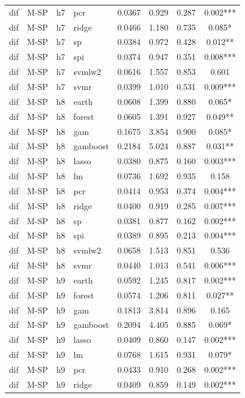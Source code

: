 \begin{ThreePartTable}
\begin{longtable}[t]{llclcccc}
dif & M-SP & h7 & pcr & 0.0367 & 0.929 & 0.287 & 0.002***\\
dif & M-SP & h7 & ridge & 0.0466 & 1.180 & 0.735 & 0.085*\\
dif & M-SP & h7 & sp & 0.0384 & 0.972 & 0.428 & 0.012**\\
dif & M-SP & h7 & spi & 0.0374 & 0.947 & 0.351 & 0.008***\\
dif & M-SP & h7 & svmlw2 & 0.0616 & 1.557 & 0.853 & 0.601\\
dif & M-SP & h7 & svmr & 0.0399 & 1.010 & 0.531 & 0.009***\\
\addlinespace
dif & M-SP & h8 & earth & 0.0608 & 1.399 & 0.880 & 0.065*\\
dif & M-SP & h8 & forest & 0.0605 & 1.391 & 0.927 & 0.049**\\
dif & M-SP & h8 & gam & 0.1675 & 3.854 & 0.900 & 0.085*\\
dif & M-SP & h8 & gamboost & 0.2184 & 5.024 & 0.887 & 0.031**\\
dif & M-SP & h8 & lasso & 0.0380 & 0.875 & 0.160 & 0.003***\\
dif & M-SP & h8 & lm & 0.0736 & 1.692 & 0.935 & 0.158\\
dif & M-SP & h8 & pcr & 0.0414 & 0.953 & 0.374 & 0.004***\\
dif & M-SP & h8 & ridge & 0.0400 & 0.919 & 0.285 & 0.007***\\
dif & M-SP & h8 & sp & 0.0381 & 0.877 & 0.162 & 0.002***\\
dif & M-SP & h8 & spi & 0.0389 & 0.895 & 0.213 & 0.004***\\
dif & M-SP & h8 & svmlw2 & 0.0658 & 1.513 & 0.851 & 0.536\\
dif & M-SP & h8 & svmr & 0.0440 & 1.013 & 0.541 & 0.006***\\
\addlinespace
dif & M-SP & h9 & earth & 0.0592 & 1.245 & 0.817 & 0.002***\\
dif & M-SP & h9 & forest & 0.0574 & 1.206 & 0.811 & 0.027**\\
dif & M-SP & h9 & gam & 0.1813 & 3.814 & 0.896 & 0.165\\
dif & M-SP & h9 & gamboost & 0.2094 & 4.405 & 0.885 & 0.069*\\
dif & M-SP & h9 & lasso & 0.0409 & 0.860 & 0.147 & 0.002***\\
dif & M-SP & h9 & lm & 0.0768 & 1.615 & 0.931 & 0.079*\\
dif & M-SP & h9 & pcr & 0.0433 & 0.910 & 0.268 & 0.002***\\
dif & M-SP & h9 & ridge & 0.0409 & 0.859 & 0.149 & 0.002***\\

\end{longtable}
\end{ThreePartTable}
